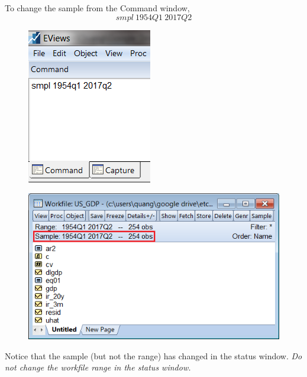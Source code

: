\documentclass[12pt]{report}
\begin{document}
\noindent To change the sample from the Command window, $$smpl\ 1954Q1\ 2017Q2$$
\begin{figure}[H]
	\centerline{\includegraphics{tute11_32}}
\end{figure}
\vspace{-\baselineskip}
\begin{figure}[H]
	\centerline{\includegraphics{tute11_33}}
\end{figure}
\vspace{-\baselineskip}
\noindent Notice that the sample (but not the range) has changed in the status window. \textit{Do not change the workfile range in the status window.}
\end{document}
